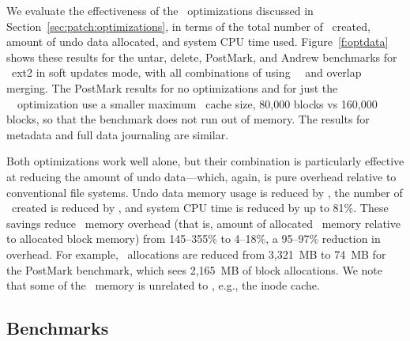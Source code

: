 \opttable{}

We evaluate the effectiveness of the \patch\ optimizations discussed in
Section~\ref{sec:patch:optimizations}, in terms of
%
the total number of \patches\ created, amount of undo data allocated,
and system CPU time used.
%
Figure~\ref{f:optdata} shows these results for the untar, delete,
PostMark, and Andrew benchmarks for \Kudos\ ext2 in soft updates mode,
with all combinations of using \nrb\ \patches\ and overlap merging.
%
The PostMark results for no optimizations and for just the \nrb\
\patches\ optimization use a smaller maximum \Kudos\ cache size,
80,000 blocks vs 160,000 blocks, so that the benchmark does not run
out of memory.
%
The results for metadata and full data journaling are similar.

Both optimizations work well alone, but their combination is particularly
effective at reducing the amount of undo data---which, again, is pure
overhead relative to conventional file systems.
%
Undo data memory usage is reduced by \patchoptundo,
%
the number of \patches\ created is reduced by \patchoptcount,
%
and system CPU time is reduced by up to 81\%.
%
These savings reduce \Kudos\ memory overhead (that is, amount of
allocated \Kudos\ memory relative to allocated block memory)
%
from 145--355\% to 4--18\%, a 95--97\% reduction in overhead. For
example, \Kudos\ allocations are reduced from 3,321~MB to 74~MB for
the PostMark benchmark, which sees 2,165~MB of block allocations.
%
We note that some of the \Kudos\ memory is unrelated to \patches,
e.g., the inode cache.


\begin{comment}
\begin{figure}[t]
\vspace{-0.5\baselineskip}
\centering{
\texttt{[image: rb\_patch\_size]}
}
\vspace{-0.5\baselineskip}
\caption{\label{fig:patchsize-histo} \Rb\ \patch\ size histogram for a sample
workload (extracting a large archive into ext2). All the \patches\ larger than
63 bytes have been optimized into \nrb\ \patches. \Rb\ \patches\ 4 bytes and
smaller account for about 51\% of all \rb\ \patches.}
\end{figure}
\end{comment}

\subsection {Benchmarks}
\label{sec:eval:bench}

